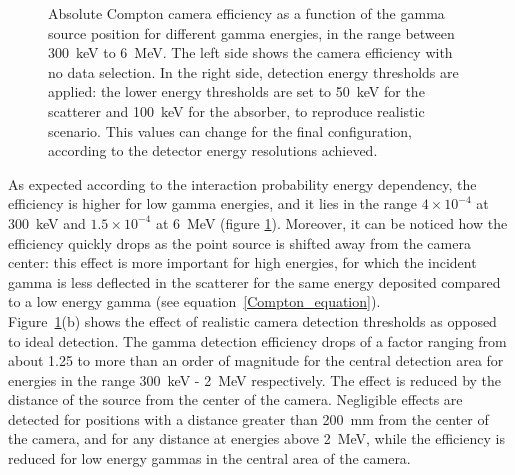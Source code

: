 \begin{figure} [!hbtp]	
\centering
{}
\caption{Absolute Compton camera efficiency as a function of the gamma source position for different gamma energies, in the range between 300~keV to 6~MeV. The left side shows the camera efficiency with no data selection. In the right side, detection energy thresholds are applied: the lower energy thresholds are set to 
50~keV for the scatterer and 100~keV for the absorber, to reproduce realistic scenario. This values can change for the final configuration, according to the detector energy resolutions achieved.}
\label{fig::efficiency_study}
\end{figure}

As expected according to the interaction probability energy dependency, the efficiency is higher for low gamma energies, and it lies in the range $4\times10^{-4}$ at 300~keV and $1.5\times10^{-4}$ at 6~MeV (figure \ref{fig::efficiency_study}). Moreover, it can be noticed how the efficiency quickly drops as the point source is shifted away from the camera center: this effect is more important for high energies, for which the incident gamma is less deflected in the scatterer for the same energy deposited compared to a low energy gamma (see equation~\ref{Compton_equation}).\\ 
Figure~\ref{fig::efficiency_study}(b) shows the effect of realistic camera detection thresholds as opposed to ideal detection. The gamma detection efficiency drops of a factor ranging from about 1.25 to more than an order of magnitude for the central detection area for energies in the range 300~keV - 2~MeV respectively. The effect is reduced by the distance of the source from the center of the camera. Negligible effects are detected for positions with a distance greater than 200~mm from the center of the camera, and for any distance at energies above 2~MeV, while the efficiency is reduced for low energy gammas in the central area of the camera. 

